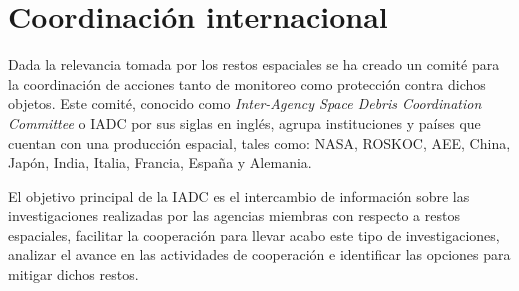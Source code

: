 \section*{Coordinación internacional} \label{sec:coordinacion}

Dada la relevancia tomada por los restos espaciales se ha creado un comité para la coordinación de acciones tanto de monitoreo como protección contra dichos objetos.
Este comité, conocido como  \textit{Inter-Agency Space Debris Coordination Committee} o IADC por sus siglas en inglés, agrupa instituciones y países que cuentan con una producción espacial, tales como: NASA, ROSKOC, AEE, China, Japón, India, Italia, Francia, España y Alemania.

El objetivo principal de la IADC es el intercambio de información sobre las investigaciones realizadas por las agencias miembras con respecto a restos espaciales, 
facilitar la cooperación para llevar acabo este tipo de investigaciones, 
analizar el avance en las actividades de cooperación 
e identificar las opciones para mitigar dichos restos.

